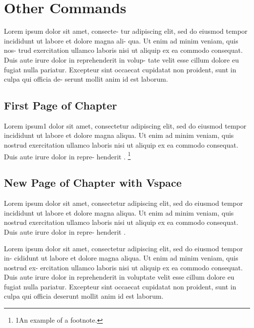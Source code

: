 

\chapter{Other Commands}
Lorem ipsum dolor sit amet, consecte-
tur adipiscing elit, sed do eiusmod tempor
incididunt ut labore et dolore magna ali-
qua. Ut enim ad minim veniam, quis nos-
trud exercitation ullamco laboris nisi ut
aliquip ex ea commodo consequat. Duis
aute irure dolor in reprehenderit in volup-
tate velit esse cillum dolore eu fugiat nulla
pariatur. Excepteur sint occaecat cupidatat
non proident, sunt in culpa qui officia de-
serunt mollit anim id est laborum.

\section{First Page of Chapter}
Lorem ipsum1 dolor sit amet, consectetur adipiscing elit, sed do eiusmod tempor incididunt
ut labore et dolore magna aliqua. Ut enim ad minim veniam, quis nostrud exercitation
ullamco laboris nisi ut aliquip ex ea commodo consequat. Duis aute irure dolor in repre-
henderit \cite{cite_0} \cite{cite_1} \cite{cite_2}.
\footnote{1An example of a footnote.}
\newpage

\section{New Page of Chapter with Vspace}
Lorem ipsum dolor sit amet, consectetur adipiscing elit, sed do eiusmod tempor incididunt
ut labore et dolore magna aliqua. Ut enim ad minim veniam, quis nostrud exercitation
ullamco laboris nisi ut aliquip ex ea commodo consequat. Duis aute irure dolor in repre-
henderit \cite{Wint_4} \cite{Wint_5} \cite{Wint_6}.
\vspace{250px}

Lorem ipsum dolor sit amet, consectetur adipiscing elit, sed do eiusmod tempor in-
cididunt ut labore et dolore magna aliqua. Ut enim ad minim veniam, quis nostrud ex-
ercitation ullamco laboris nisi ut aliquip ex ea commodo consequat. Duis aute irure dolor
in reprehenderit in voluptate velit esse cillum dolore eu fugiat nulla pariatur. Excepteur
sint occaecat cupidatat non proident, sunt in culpa qui officia deserunt mollit anim id est
laborum.